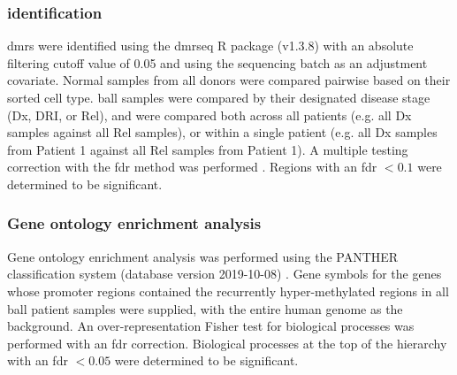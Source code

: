 \subsubsection{ identification}

\Glspl{dmr} were identified using the dmrseq R package (v1.3.8) \cite{korthauerDetectionAccurateFalse2018} with an absolute filtering cutoff value of 0.05 and using the sequencing batch as an adjustment covariate.
Normal samples from all donors were compared pairwise based on their sorted cell type.
\Gls{ball} samples were compared by their designated disease stage (Dx, DRI, or Rel), and were compared both across all patients (e.g. all Dx samples against all Rel samples), or within a single patient (e.g. all Dx samples from Patient 1 against all Rel samples from Patient 1).
A multiple testing correction with the \gls{fdr} method was performed \cite{benjaminiControllingFalseDiscovery1995}.
Regions with an \gls{fdr} $< 0.1$ were determined to be significant.

\subsubsection{Gene ontology enrichment analysis}

Gene ontology enrichment analysis was performed using the PANTHER classification system (database version 2019-10-08) \cite{miLargescaleGeneFunction2013}.
Gene symbols for the genes whose promoter regions contained the recurrently hyper-methylated regions in all \gls{ball} patient samples were supplied, with the entire human genome as the background.
An over-representation Fisher test for biological processes was performed with an \gls{fdr} correction.
Biological processes at the top of the hierarchy with an \gls{fdr} $< 0.05$ were determined to be significant.
